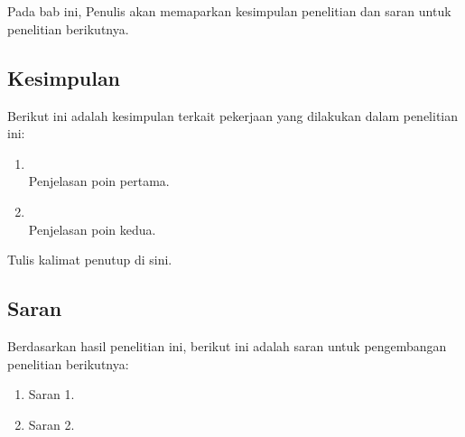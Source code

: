 \chapter{\kesimpulan}
\label{bab:6}
Pada bab ini, Penulis akan memaparkan kesimpulan penelitian dan saran untuk penelitian berikutnya.


\section{Kesimpulan}
\label{sec:kesimpulan}
Berikut ini adalah kesimpulan terkait pekerjaan yang dilakukan dalam penelitian ini:
\begin{enumerate}
	\item {} \\
	Penjelasan poin pertama.
	\item {} \\
	Penjelasan poin kedua.
\end{enumerate}

Tulis kalimat penutup di sini.


\section{Saran}
\label{sec:saran}
Berdasarkan hasil penelitian ini, berikut ini adalah saran untuk pengembangan penelitian berikutnya:
\begin{enumerate}
	\item Saran 1.
	\item Saran 2.
\end{enumerate}
